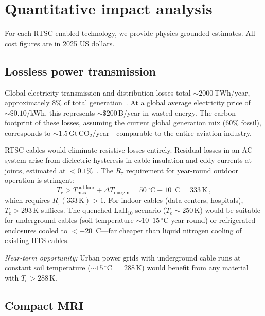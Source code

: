 \documentclass[prl,twocolumn,superscriptaddress,longbibliography,floatfix]{revtex4-2}
\newcommand{\tauasym}{\tau}
\newcommand{\Rtau}{R_{\tauasym}}
\newcommand{\Tc}{T_{\mathrm{c}}}
\begin{document}
\section{Quantitative impact analysis}
\label{sec:impact}

For each RTSC-enabled technology, we provide physics-grounded
estimates.  All cost figures are in 2025 US dollars.

\subsection{Lossless power transmission}

Global electricity transmission and distribution losses total
$\sim 2000\,$TWh/year, approximately 8\% of total
generation~\cite{IEA2024}.  At a global average electricity
price of $\sim \$0.10$/kWh, this represents
$\sim \$200\,$B/year in wasted energy.  The carbon footprint
of these losses, assuming the current global generation mix
(60\% fossil), corresponds to $\sim 1.5\,$Gt\,CO$_2$/year---comparable
to the entire aviation industry.

RTSC cables would eliminate resistive losses entirely.
Residual losses in an AC system arise from dielectric
hysteresis in cable insulation and eddy currents at joints,
estimated at $< 0.1\%$~\cite{Malozemoff2012}.  The
$\Rtau$ requirement for year-round outdoor operation is
stringent:
\begin{equation}\label{eq:Tc_outdoor}
  \Tc > T_{\max}^{\mathrm{outdoor}} + \Delta T_{\mathrm{margin}}
  = 50\,^\circ\mathrm{C} + 10\,^\circ\mathrm{C}
  = 333\,\mathrm{K}\,,
\end{equation}
which requires $\Rtau(333\,\mathrm{K}) > 1$.  For indoor
cables (data centers, hospitals), $\Tc > 293\,$K suffices.
The quenched-LaH$_{10}$ scenario ($\Tc \sim 250\,$K) would be
suitable for underground cables (soil temperature $\sim 10$--$15\,^\circ$C
year-round) or refrigerated enclosures cooled to
$< -20\,^\circ$C---far cheaper than liquid nitrogen
cooling of existing HTS cables.

\emph{Near-term opportunity:} Urban power grids with
underground cable runs at constant soil temperature
($\sim 15\,^\circ$C $= 288\,$K) would benefit from any
material with $\Tc > 288\,$K.

\subsection{Compact MRI}
\end{document}
